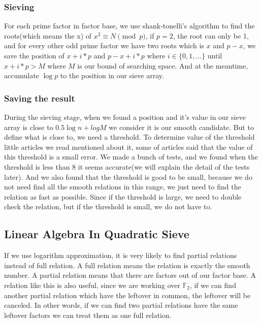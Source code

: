 \documentclass[12pt]{article} %
\begin{document}
\subsubsection {Sieving}

For each prime factor in factor base, we use shank-tonelli's algorithm to find the roots(which means the x) of $x^2 \equiv N \pmod{p}$, if $p = 2$, the root can only be 1, and for every other odd prime factor we have two roots which is $x$ and $p-x$, we save the position of $x+i*p$ and $p-x+i*p$ where $i \in \{0, 1, \dots \}$ until $x+i*p>M$ where $M$ is our bound of searching space. And at the meantime, accumulate $\log{p}$ to the position in our sieve array.

\subsubsection {Saving the result}

During the sieving stage, when we found a position and it's value in our sieve array is close to $0.5\log{n} + log{M}$ we consider it is our smooth candidate. But to define what is close to, we need a threshold. To determine value of the threshold little articles we read mentioned about it, some of articles said that the value of this threshold is a small error. We made a bunch of tests, and we found when the threshold is less than 8 it seems accurate(we will explain the detail of the tests later). And we also found that the threshold is good to be small, because we do not need find all the smooth relations in this range, we just need to find the relation as fast as possible. Since if the threshold is large, we need to double check the relation, but if the threshold is small, we do not have to.

\subsection {Linear Algebra In Quadratic Sieve}

If we use logarithm approximation, it is very likely to find partial relations instead of full relation. A full relation means the relation is exactly the smooth number. A partial relation means that there are factors out of our factor base. A relation like this is also useful, since we are working over $\mathbb{F}_2$, if we can find another partial relation which have the leftover in common, the leftover will be canceled. In other words, if we can find two partial relations have the same leftover factors we can treat them as one full relation.
\end{document}
